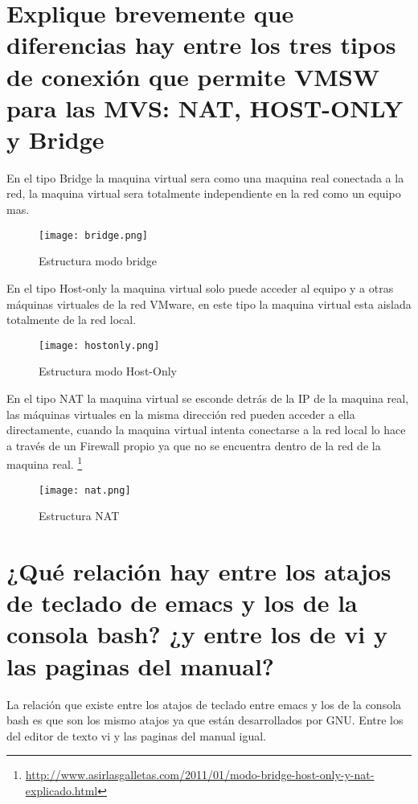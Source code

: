 \section{Explique brevemente que diferencias hay entre los tres tipos de conexión que permite VMSW para las MVS: NAT, HOST-ONLY y Bridge}
En el tipo Bridge la maquina virtual sera como una maquina real conectada a la red, la maquina virtual sera totalmente independiente en la red como un equipo mas.
\begin{figure}[H] 
\centering
\texttt{[image: bridge.png]}  
\label{figura17:}
\caption{Estructura modo bridge}
\end{figure}
En el tipo Host-only la maquina virtual solo puede acceder al equipo y a otras máquinas virtuales de la red VMware, en este tipo la maquina virtual esta aislada totalmente de la red local.
\begin{figure}[H] 
\centering
\texttt{[image: hostonly.png]}  
\label{figura18:}
\caption{Estructura modo Host-Only}
\end{figure}
En el tipo NAT la maquina virtual se esconde detrás de la IP de la maquina real, las máquinas virtuales en la misma dirección red pueden acceder a ella directamente, cuando la maquina virtual intenta conectarse a la red local lo hace a través de un Firewall propio ya que no se encuentra dentro de la red de la maquina real.
\footnote{\url{http://www.asirlasgalletas.com/2011/01/modo-bridge-host-only-y-nat-explicado.html}}
\begin{figure}[H] 
\centering
\texttt{[image: nat.png]}  
\label{figura19:}
\caption{Estructura NAT}
\end{figure}


\section{¿Qué relación hay entre los atajos de teclado de emacs y los de la consola bash? ¿y entre los de vi y las paginas del manual?}
La relación que existe entre los atajos de teclado entre emacs y los de la consola bash es que son los mismo atajos ya que están desarrollados por GNU.
Entre los del editor de texto vi y las paginas del manual igual.

